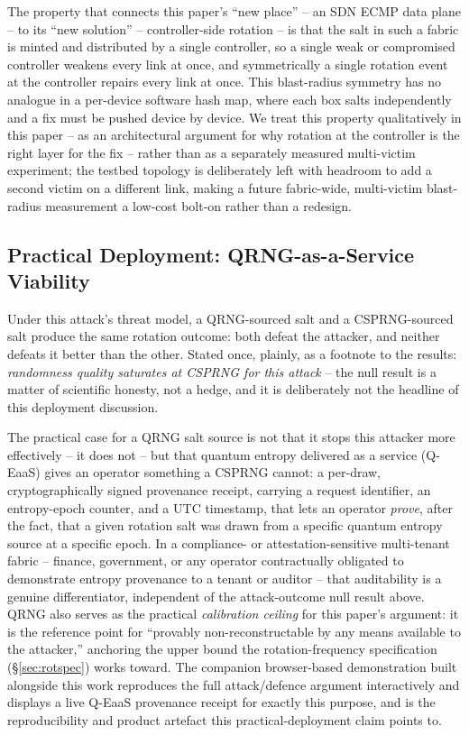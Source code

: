\documentclass[conference]{IEEEtran}
\begin{document}
The property that connects this paper's ``new place'' -- an SDN ECMP data plane -- to its ``new solution'' --
controller-side rotation -- is that the salt in such a fabric is minted and distributed by a single controller,
so a single weak or compromised controller weakens every link at once, and symmetrically a single rotation event
at the controller repairs every link at once. This blast-radius symmetry has no analogue in a per-device
software hash map, where each box salts independently and a fix must be pushed device by device. We treat this
property qualitatively in this paper -- as an architectural argument for why rotation at the controller is the
right layer for the fix -- rather than as a separately measured multi-victim experiment; the testbed topology is
deliberately left with headroom to add a second victim on a different link, making a future fabric-wide,
multi-victim blast-radius measurement a low-cost bolt-on rather than a redesign.

\subsection{Practical Deployment: QRNG-as-a-Service Viability}

Under this attack's threat model, a QRNG-sourced salt and a CSPRNG-sourced salt produce the same rotation
outcome: both defeat the attacker, and neither defeats it better than the other. Stated once, plainly, as a
footnote to the results: \emph{randomness quality saturates at CSPRNG for this attack} -- the null result is a
matter of scientific honesty, not a hedge, and it is deliberately not the headline of this deployment discussion.

The practical case for a QRNG salt source is not that it stops this attacker more effectively -- it does not --
but that quantum entropy delivered as a service (Q-EaaS) gives an operator something a CSPRNG cannot: a
per-draw, cryptographically signed provenance receipt, carrying a request identifier, an entropy-epoch counter,
and a UTC timestamp, that lets an operator \emph{prove}, after the fact, that a given rotation salt was drawn
from a specific quantum entropy source at a specific epoch. In a compliance- or attestation-sensitive multi-tenant
fabric -- finance, government, or any operator contractually obligated to demonstrate entropy provenance to a
tenant or auditor -- that auditability is a genuine differentiator, independent of the attack-outcome null
result above. QRNG also serves as the practical \emph{calibration ceiling} for this paper's argument: it is the
reference point for ``provably non-reconstructable by any means available to the attacker,'' anchoring the upper
bound the rotation-frequency specification (\S\ref{sec:rotspec}) works toward. The companion browser-based
demonstration built alongside this work reproduces the full attack/defence argument interactively and displays a
live Q-EaaS provenance receipt for exactly this purpose, and is the reproducibility and product artefact this
practical-deployment claim points to.
\end{document}
